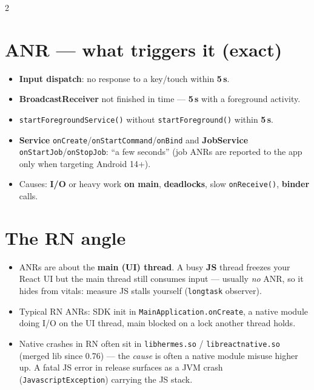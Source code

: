 \documentclass[8pt]{extarticle}
\begin{document}
\begin{multicols}{2}
\raggedright

\section{ANR — what triggers it (exact)}
\begin{itemize}\raggedright
  \item \textbf{Input dispatch}: no response to a key/touch within \textbf{5\,s}.
  \item \textbf{BroadcastReceiver} not finished in time — \textbf{5\,s} with a foreground activity.
  \item \texttt{startForegroundService()} without \texttt{startForeground()} within \textbf{5\,s}.
  \item \textbf{Service} \texttt{onCreate}/\texttt{onStartCommand}/\texttt{onBind} and
        \textbf{JobService} \texttt{onStartJob}/\texttt{onStopJob}: ``a few seconds'' (job
        ANRs are reported to the app only when targeting Android 14+).
  \item Causes: \textbf{I/O} or heavy work \textbf{on main}, \textbf{deadlocks}, slow
        \texttt{onReceive()}, \textbf{binder} calls.
\end{itemize}

\section{The RN angle}
\begin{itemize}\raggedright
  \item ANRs are about the \textbf{main (UI) thread}. A busy \textbf{JS} thread freezes your
        React UI but the main thread still consumes input — usually \emph{no} ANR, so it
        hides from vitals: measure JS stalls yourself (\texttt{longtask} observer).
  \item Typical RN ANRs: SDK init in \texttt{MainApplication.onCreate}, a native module doing
        I/O on the UI thread, main blocked on a lock another thread holds.
  \item Native crashes in RN often sit in \texttt{libhermes.so} / \texttt{libreactnative.so}
        (merged lib since 0.76) — the \emph{cause} is often a native module misuse higher
        up. A fatal JS error in release surfaces as a JVM crash
        (\texttt{JavascriptException}\unverified) carrying the JS stack.
\end{itemize}


\end{multicols}
\end{document}
